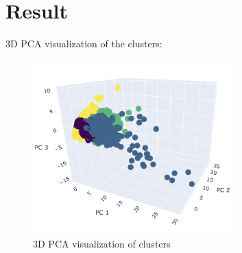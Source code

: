 \section{Result}
3D PCA visualization of the clusters:

\begin{figure}[h!]
    \centering
    \includegraphics[width=0.7\textwidth]{src/figs/3d_PCA_HC.png} 
    \caption{3D PCA visualization of clusters}
\end{figure}